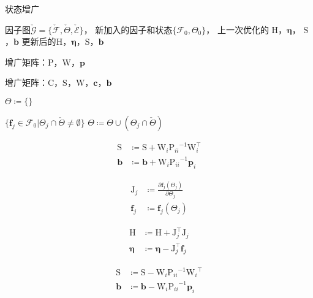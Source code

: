 \begin{algorithm}
\caption{状态增广}
\begin{algorithmic}
    \Require 因子图$\check{\mathcal{G}}=\{\check{\mathcal{F}},\check{\Theta},\check{\mathcal{E}}\}$，
             新加入的因子和状态$\{\mathcal{F}_0,\Theta_0\}$，
             上一次优化的
             $\mathrm{H}$，$\bm{\eta}$，
             $\mathrm{S}$，$\bm{b}$
    \Ensure 更新后的$\mathrm{H}$，$\bm{\eta}$，$\mathrm{S}$，$\bm{b}$

        \State 增广矩阵：$\mathrm{P}$，$\mathrm{W}$，$\bm{p}$
    \EndFor

        \State 增广矩阵：$\mathrm{C}$，$\mathrm{S}$，$\mathrm{W}$，$\bm{c}$，$\bm{b}$
    \EndFor

    \State $\Theta\coloneqq\{\}$

    \ForAll
    {$\{
            \bm{f}_j\in\mathcal{F}_0 |
            \Theta_j \cap \check{\Theta} \neq \emptyset
    \}$}
        \State $\Theta \coloneqq \Theta \cup (\Theta_j \cap \check{\Theta})$
    \EndFor

        \[\begin{aligned}
                \mathrm{S} &\coloneqq \mathrm{S} + \mathrm{W}_i{\mathrm{P}_{ii}}^{-1}\mathrm{W}_i^\top \\
                \bm{b}     &\coloneqq \bm{b}     + \mathrm{W}_i{\mathrm{P}_{ii}}^{-1}\bm{p}_i
        \end{aligned}\]
    \EndFor

        \[\begin{aligned}
                \mathrm{J}_j &\coloneqq \frac{\partial{\bm{f}_j}(\Theta_j)}
                                             {\partial{\Theta_j}} \\
                \bm{f}_j     &\coloneqq \bm{f}_j(\Theta_j)
        \end{aligned}\]

        \[\begin{aligned}
                \mathrm{H} &\coloneqq \mathrm{H} + \mathrm{J}_j^\top\mathrm{J}_j \\
                \bm{\eta}  &\coloneqq \bm{\eta}  - \mathrm{J}_j^\top\bm{f}_j
        \end{aligned}\]
    \EndFor

        \[\begin{aligned}
                \mathrm{S} &\coloneqq \mathrm{S} - \mathrm{W}_i{\mathrm{P}_{ii}}^{-1}{\mathrm{W}_i}^\top \\
                \bm{b}     &\coloneqq \bm{b}     - \mathrm{W}_i{\mathrm{P}_{ii}}^{-1}\bm{p}_i
        \end{aligned}\]
    \EndFor

\end{algorithmic}
\label{alg:factor_graph_aug}
\end{algorithm}
